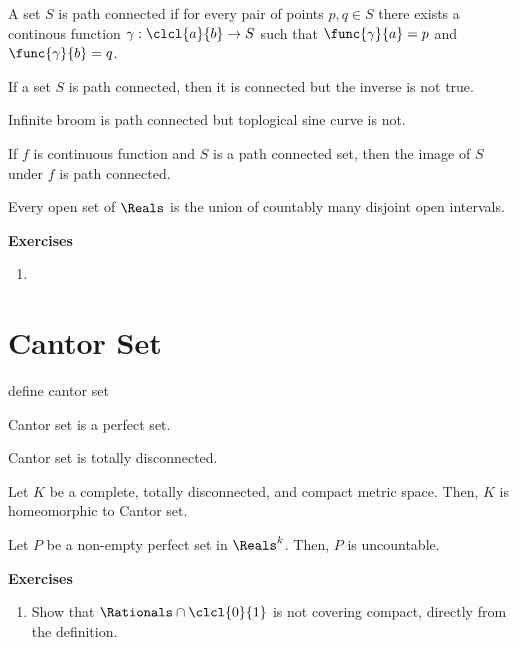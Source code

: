 \begin{definition}
    A set \(S\) is path connected if for every pair of points \(p,q \in S\) there exists a continous function \(\gamma: \clcl{a}{b} \to S\) such that \(\func{\gamma}{a} = p\) and \(\func{\gamma}{b} = q\).
\end{definition}
\begin{theorem}
    If a set \(S\) is path connected, then it is connected but the inverse is not true.
\end{theorem}
\begin{example}
    Infinite broom is path connected but toplogical sine curve is not.
\end{example}
\begin{proposition}
    If \(f\) is continuous function and \(S\) is a path connected set, then the image of \(S\) under \(f\) is path connected.
\end{proposition}
\begin{proposition}
    Every open set of \(\Reals\) is the union of countably many disjoint open intervals.
\end{proposition}
{\Large\textbf{Exercises}}
\begin{enumerate}
    \item
\end{enumerate}


\newpage


\section{Cantor Set}
\begin{definition}
    define cantor set
\end{definition}

\begin{proposition}
    Cantor set is a perfect set.
\end{proposition}

\begin{proposition}
    Cantor set is totally disconnected.
\end{proposition}
\begin{theorem}
    Let \(K\) be a complete, totally disconnected, and compact metric space. Then, \(K\) is homeomorphic to Cantor set.
\end{theorem}

\begin{theorem}
    Let \(P\) be a non-empty perfect set in \(\Reals^k\). Then, \(P\) is uncountable.
\end{theorem}

{\Large\textbf{Exercises}}
\begin{enumerate}
    \item Show that \(\Rationals \cap \clcl{0}{1}\) is not covering compact, directly from the definition.
\end{enumerate}